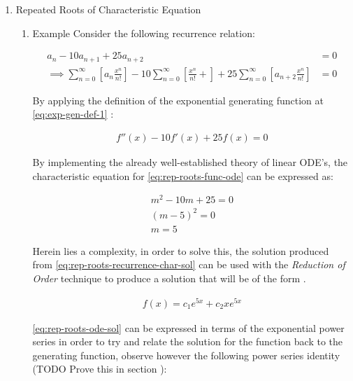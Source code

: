 \documentclass[11pt]{article}
\begin{document}
\begin{enumerate}
\item Repeated Roots of Characteristic Equation
\label{rep-roots-recurrence}
\begin{enumerate}
\item Example
\label{sec:orgc03d12a}
Consider the following recurrence relation:

\begin{align}
    a_n -  10a_{n+ 1} +  25a_{n+  2}&= 0 \label{eq:hom-repeated-roots-recurrence} \\
    \implies  \sum^{\infty}_{n= 0}   {\left[{ a_n \frac{x^n}{n!} }\right]} - 10 \sum^{\infty}_{n= 0}   {\left[{ \frac{x^n}{n!}+    }\right]} + 25 \sum^{\infty}_{n= 0 }   {\left[{  a_{n+  2 }\frac{x^n}{n!} }\right]}&= 0 \nonumber
\end{align}

By applying the definition of the exponential generating function at \eqref{eq:exp-gen-def-1} :

\begin{align}
    f''{\left({ x }\right)}- 10f'{\left({ x }\right)}+  25f{\left({ x }\right)}= 0 \nonumber \label{eq:rep-roots-func-ode}
\end{align}

By implementing the already well-established theory of linear ODE's, the characteristic equation for \eqref{eq:rep-roots-func-ode} can be expressed as:

\begin{align}
    m^2- 10m+  25 = 0 \nonumber \\
    {\left({ m- 5 }\right)}^2 = 0 \nonumber \\
    m= 5 \label{eq:rep-roots-recurrence-char-sol}
\end{align}

Herein lies a complexity, in order to solve this, the solution produced from \eqref{eq:rep-roots-recurrence-char-sol} can be used with the \emph{Reduction of Order} technique to produce a solution that will be of the form \cite[]{zillMatrixExponential2009}.

\begin{align}
    f{\left({ x }\right)}= c_1e^{5x} +  c_2 x e^{5x} \label{eq:rep-roots-ode-sol}
\end{align}

\eqref{eq:rep-roots-ode-sol} can be expressed in terms of the exponential power series in order to try and relate the solution for the function back to the generating function,
observe however the following power series identity (TODO Prove this in section ):


\end{enumerate}
\end{enumerate}
\end{document}
